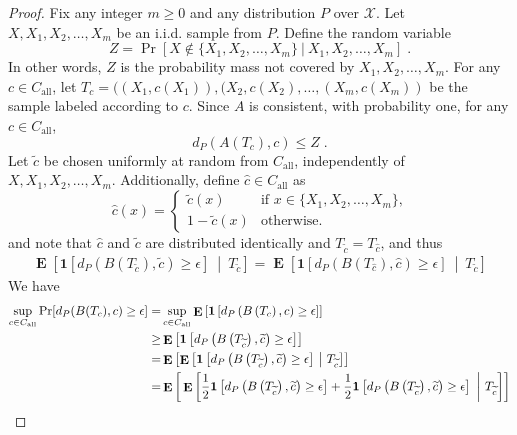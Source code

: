 \documentclass[11pt]{article}
\newcommand{\X}{\mathcal{X}}
\newcommand{\indicator}[1]{\mathbf{1}\left[{#1}\right]}
\DeclareMathOperator{\Exp}{\mathbf{E}}
\begin{document}
\begin{proof}
Fix any integer $m \ge 0$ and any distribution $P$ over $\X$. Let $X, X_1, X_2,
\dots, X_m$ be an i.i.d. sample from $P$.
Define the random variable
$$
Z = \Pr[X \not \in \{X_1, X_2, \dots, X_m\} ~|~ X_1, X_2, \dots, X_m] \; .
$$
In other words, $Z$ is the probability mass not covered by $X_1, X_2, \dots, X_m$.
For any $c \in C_{\text{all}}$, let
$T_c = ((X_1, c(X_1)), (X_2, c(X_2), \dots, (X_m, c(X_m))$ be the sample labeled
according to $c$. Since $A$ is consistent, with probability one,
for any $c \in C_{\text{all}}$,
\begin{equation}
\label{equation:relate-dP-to-Z}
d_P(A(T_c),c) \leq Z \;.
\end{equation}
Let $\widetilde c$ be chosen uniformly at random from
$C_{\text{all}}$, independently of $X, X_1, X_2, \dots, X_m$. 
Additionally, define $\widehat c \in C_{\text{all}}$ as
$$
\widehat c(x) =
\begin{cases}
\widetilde{c}(x) & \text{if $x \in \{X_1, X_2, \dots, X_m\}$,} \\
1 - \widetilde{c}(x) & \text{otherwise}.
\end{cases}
$$
and note that $\widehat c$ and $\widetilde c$ are distributed identically and $T_{\widetilde{c}} = T_{\widehat{c}}$, and  thus
\begin{align}
\Exp \left[ \indicator{d_P \left(B\left( T_{\widetilde c} \right), \widetilde c \right) \ge \epsilon} ~\middle|~ T_{\widetilde{c}} \right]
=\Exp \left[ \indicator{d_P \left(B\left( T_{\widehat c} \right), \widehat c \right) \ge \epsilon} ~\middle|~ T_{\widetilde{c}} \right]
\label{eq: widehatc and widetildec are identically distributed}
\end{align}
We have
\begin{align}
\sup_{c \in C_{\text{all}}} \Pr[d_P(B(T_c),c) \ge \epsilon] 
= & \sup_{c \in C_{\text{all}}} \Exp \left[ \indicator{d_P \left(B\left( T_c\right), c \right) \ge \epsilon} \right] \notag \\
\ge & \Exp \left[ \indicator{d_P \left(B\left( T_{\widetilde c} \right), \widetilde c \right) \ge \epsilon} \right] \notag \\
= & \Exp \left[ \Exp \left[ \indicator{d_P \left(B\left( T_{\widetilde c} \right), \widetilde c \right) \ge \epsilon} ~\middle|~ T_{\widetilde{c}} \right] \right] \notag \\
= & \Exp \bigg[\Exp \bigg[\frac{1}{2}  \indicator{d_P \left(B\left( T_{\widetilde c} \right), \widetilde c \right) \ge \epsilon}  + \frac{1}{2} \indicator{d_P \left(B\left( T_{\widetilde c} \right), \widetilde c \right) \ge \epsilon} ~\bigg|~ T_{\widetilde{c}} \bigg] \bigg] 

\end{align}
\end{proof}
\end{document}
